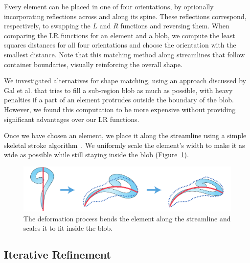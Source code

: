 Every element can be placed in one of four orientations, by optionally 
incorporating reflections across and along its spine.  These reflections
correspond, respectively, to swapping the $L$ and $R$ functions and reversing
them.  When comparing the LR functions for an element and a blob, we compute
the least squares distances for all four orientations and choose the 
orientation with the smallest distance.  Note that this matching method
  along streamlines that follow container
boundaries, visually reinforcing the overall shape.

We investigated alternatives for shape matching, using an approach
discussed by Gal et al. \cite{Gal2007B} that tries to fill a sub-region
blob as much as possible, with heavy penalties if a part of an
element protrudes outside the boundary of the blob. However, we found
this computation to be more expensive without providing significant
advantages over our LR functions.

Once we have chosen an element, we place it along the streamline using a
simple skeletal stroke algorithm~\cite{Hsu1993}. We uniformly scale the element's width
to make it as wide as possible while still staying inside the blob
(Figure~\ref{shape_deformation}).

\begin{figure}
\centering
\includegraphics[width=1.0\textwidth]{figures/flowpak/shape_deformation.pdf}
\caption[Element deformation]
{\label{shape_deformation}
The deformation process bends the element along the streamline and
scales it to fit inside the blob.}
\end{figure}

\subsection{Iterative Refinement}
\label{flowpak_iterative_refinement}

